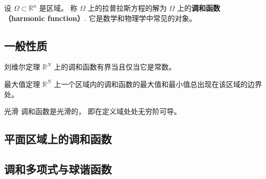 
\begin{issues}
\issueDraft
\end{issues}


设 $\Omega\subset\mathbb{R}^n$ 是区域。 称 $\Omega$ 上的拉普拉斯方程的解为 $\Omega$ 上的\textbf{调和函数 （harmonic function）}. 它是数学和物理学中常见的对象。


\subsection{一般性质}
\begin{theorem}{刘维尔定理}\label{the_HarFun_1}
$\mathbb R^N$ 上的调和函数有界当且仅当它是常数。
\end{theorem}

\begin{theorem}{最大值定理}
$\mathbb R^N$ 上一个区域内的调和函数的最大值和最小值总出现在该区域的边界处。
\end{theorem}

\begin{theorem}{光滑}
调和函数是光滑的， 即在定义域处处无穷阶可导。
\end{theorem}



\subsection{平面区域上的调和函数}


\subsection{调和多项式与球谐函数}

